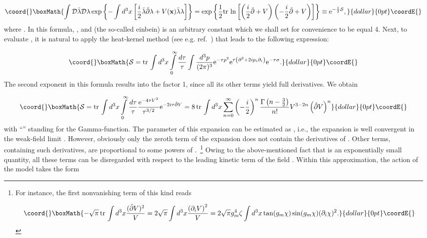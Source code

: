 \documentclass[a4paper,12pt]{article}
\begin{document}
$$\coord{}\boxMath{\int {\cal D}\bar\lambda{\cal D}\lambda\exp
\left\{-\int d^3x\left[\frac{i}{2}\bar\lambda\hat\partial\lambda+V({\bf x})\bar\lambda\lambda
\right]\right\}=\exp\left\{\frac12{\rm tr}{\,}\ln\left[\left(\frac{i}{2}\hat\partial+V\right)\left(-\frac{i}{2}\hat\partial+V\right)
\right]\right\}\equiv{\rm e}^{-\frac12{\cal S}},}{dollar}{0pt}\coordE{}$$
where
\coordHE{}. In this formula,
\coordHE{}, and \coordHE{} (the so-called einbein) is an arbitrary constant
which we shall set for convenience to be equal 4. Next, to evaluate \coordHE{}, it is natural to apply the heat-kernel method
(see e.g. ref.~\cite{book}) that leads to the following expression:

$$\coord{}\boxMath{{\cal S}={\rm tr}{\,}\int d^3x\int\limits_{0}^{\infty}\frac{d\tau}{\tau}\int\frac{d^3p}{(2\pi)^3}{\rm e}^{-\tau p^2}
{\rm e}^{\tau\left(\partial^2+2ip_i\partial_i\right)}{\rm e}^{-\tau\sigma}.}{dollar}{0pt}\coordE{}$$
The second exponent in this formula results into the factor 1, since all its other terms yield full derivatives. We obtain

$$\coord{}\boxMath{{\cal S}={\rm tr}{\,}\int d^3x\int\limits_{0}^{\infty}\frac{d\tau}{\tau}\frac{{\rm e}^{-4\tau V^2}}{\tau^{3/2}}
{\rm e}^{-2i\tau\hat\partial V}=8{\,}{\rm tr}{\,}\int d^3x\sum\limits_{n=0}^{\infty}\left(-\frac{i}{2}\right)^n
\frac{\Gamma\left(n-\frac32\right)}{n!}V^{3-2n}\left(\hat\partial V\right)^n}{dollar}{0pt}\coordE{}$$
with ``\myHighlight{$\Gamma$}\coordHE{}'' standing for the Gamma-function. The parameter of this expansion can be estimated as
\coordHE{}, i.e., the expansion is well convergent in the
weak-field limit \coordHE{}. However, obviously only the zeroth term of the expansion does not contain the
derivatives of \myHighlight{$\chi$}\coordHE{}. Other terms, containing
such derivatives, are proportional to some powers of \coordHE{}.~\footnote{For instance,
the first nonvanishing term of this kind reads

$$\coord{}\boxMath{-\sqrt{\pi}{\,}{\rm tr}{\,}\int d^3x\frac{(\hat\partial V)^2}{V}=
2\sqrt{\pi}\int d^3x\frac{\left(\partial_i V\right)^2}{V}=
2\sqrt{\pi}g_m^4\zeta\int d^3x\tan(g_m\chi)\sin(g_m\chi)(\partial_i\chi)^2.}{dollar}{0pt}\coordE{}$$} Owing to the above-mentioned fact that \coordHE{}
is an exponentially small quantity, all these terms can be disregarded with respect to the leading kinetic term of the
field \myHighlight{$\chi$}\coordHE{}. Within this approximation, the action of the model takes the form
\end{document}
